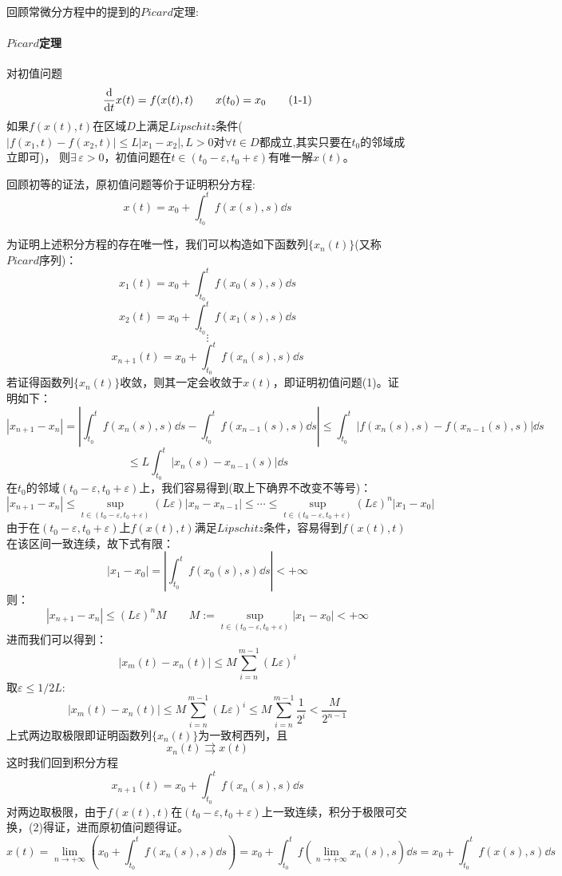 回顾常微分方程中的提到的$Picard$定理:

\paragraph*{$Picard$定理} \quad 对初值问题
\[\dv{}{t}x(t)=f(x(t),t) \qquad x(t_0)=x_0 \tag{1-1}\]
如果$f(x(t),t)$在区域$D$上满足$Lipschitz$条件($|f(x_1,t)-f(x_2,t)| \leq L|x_1-x_2|,L>0$对$\forall t \in D$都成立,其实只要在$t_0$的邻域成立即可)，
则$\exists \, \varepsilon > 0$，初值问题在$t \in (t_0-\varepsilon,t_0+\varepsilon)$有唯一解$x(t)$。

回顾初等的证法，原初值问题等价于证明积分方程:
\[x(t)=x_0+\int_{t_0}^tf(x(s),s)\dd s \tag{1-2}\]

为证明上述积分方程的存在唯一性，我们可以构造如下函数列$\{x_n(t)\}$(又称$Picard$序列)：
\[x_1(t)=x_0+\int_{t_0}^tf(x_0(s),s)\dd s\]
\[x_2(t)=x_0+\int_{t_0}^tf(x_1(s),s)\dd s\]
\[\vdots\]
\[x_{n+1}(t)=x_0+\int_{t_0}^tf(x_n(s),s)\dd s\]
若证得函数列$\{x_n(t)\}$收敛，则其一定会收敛于$x(t)$，即证明初值问题(1)。证明如下：
\[|x_{n+1}-x_n|=\left|\int_{t_0}^tf(x_n(s),s)\dd s-\int_{t_0}^tf(x_{n-1}(s),s)\dd s\right| \leq \int_{t_0}^t \left| f(x_n(s),s)-f(x_{n-1}(s),s) \right| \dd s\]
\[\leq L\int_{t_0}^t \left| x_n(s)-x_{n-1}(s) \right| \dd s\]
在$t_0$的邻域$(t_0-\varepsilon,t_0+\varepsilon)$上，我们容易得到(取上下确界不改变不等号)：
\[|x_{n+1}-x_n| \leq {\mathop {\text{sup}}\limits_{t \in (t_0-\varepsilon,t_0+\varepsilon)}} (L\varepsilon)|x_{n}-x_{n-1}| \leq \cdots \leq {\mathop {\text{sup}}\limits_{t \in (t_0-\varepsilon,t_0+\varepsilon)}} (L\varepsilon)^n|x_1-x_0|\]
由于在$(t_0-\varepsilon,t_0+\varepsilon)$上$f(x(t),t)$满足$Lipschitz$条件，容易得到$f(x(t),t)$在该区间一致连续，故下式有限：
\[|x_1-x_0|=|\int_{t_0}^tf(x_0(s),s)\dd s|<+\infty\]
则：
\[|x_{n+1}-x_n| \leq (L\varepsilon)^nM \qquad M:={\mathop {\text{sup}}\limits_{t \in (t_0-\varepsilon,t_0+\varepsilon)}} |x_1-x_0| <+\infty\]
进而我们可以得到：
\[|x_m(t)-x_n(t)| \leq M\sum_{i=n}^{m-1}(L\varepsilon)^i\]
取$\varepsilon \leq 1/2L$:
\[|x_m(t)-x_n(t)| \leq M\sum_{i=n}^{m-1}(L\varepsilon)^i \leq M\sum_{i=n}^{m-1}\frac{1}{2^i} < \frac{M}{2^{n-1}}\]
上式两边取极限即证明函数列$\{x_n(t)\}$为一致柯西列，且
\[x_n(t) \rightrightarrows x(t)\]
这时我们回到积分方程
\[x_{n+1}(t)=x_0+\int_{t_0}^tf(x_n(s),s)\dd s\]
对两边取极限，由于$f(x(t),t)$在$(t_0-\varepsilon,t_0+\varepsilon)$上一致连续，积分于极限可交换，(2)得证，进而原初值问题得证。
\[x(t)=\lim_{n \rightarrow +\infty}\left(x_0+\int_{t_0}^tf(x_n(s),s)\dd s\right)=x_0+\int_{t_0}^tf \left (\lim_{n \rightarrow +\infty}x_n(s),s \right )\dd s=x_0+\int_{t_0}^tf(x(s),s)\dd s\]

